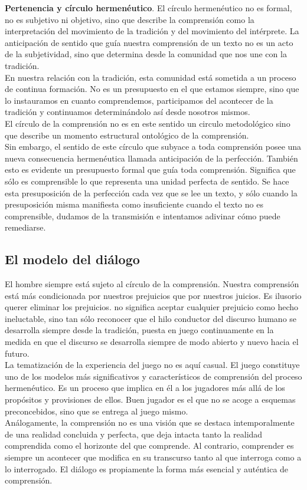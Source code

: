 \documentclass[a4paper, 11pt, twocolumn, spanish]{article}
\begin{document}
\textbf{Pertenencia y círculo hermenéutico}. El círculo hermenéutico no es
 formal, no es subjetivo ni objetivo, sino que describe la comprensión
 como la interpretación del movimiento de la tradición y del
 movimiento del intérprete. La anticipación de sentido que guía
 nuestra comprensión de un texto no es un acto de la subjetividad,
 sino que determina desde la comunidad que nos une con la
 tradición.\\[0pt]
 En nuestra relación con la tradición, esta comunidad está sometida a
 un proceso de continua formación. No es un presupuesto en el que
 estamos siempre, sino que lo instauramos en cuanto comprendemos,
 participamos del acontecer de la tradición y continuamos
 determinándolo así desde nosotros mismos.\\[0pt]
 El círculo de la comprensión no es en este sentido un circulo
 metodológico sino que describe un momento estructural ontológico de
 la comprensión.\\[0pt]
 Sin embargo, el sentido de este círculo que subyace a toda
 comprensión posee una nueva consecuencia hermenéutica llamada
 anticipación de la perfección. También esto es evidente un
 presupuesto formal que guía toda comprensión. Significa que sólo es
 comprensible lo que representa una unidad perfecta de sentido. Se
 hace esta presuposición de la perfección cada vez que se lee un
 texto, y sólo cuando la presuposición misma manifiesta como
 insuficiente cuando el texto no es comprensible, dudamos de la
 transmisión e intentamos adivinar cómo puede remediarse.


\subsection{El modelo del diálogo}
\label{sec:org752a4e3}
El hombre siempre está sujeto al círculo de la comprensión. Nuestra
comprensión está más condicionada por nuestros prejuicios que por
nuestros juicios. Es ilusorio querer eliminar los prejuicios. no
significa aceptar cualquier prejuicio como hecho ineluctable, sino tan
sólo reconocer que el hilo conductor del discurso humano se desarrolla
siempre desde la tradición, puesta en juego continuamente en la medida
en que el discurso se desarrolla siempre de modo abierto y nuevo hacia
el futuro.\\[0pt]

La tematización de la experiencia del juego no es aquí casual. El
juego constituye uno de los modelos más significativos y
característicos de comprensión del proceso hermenéutico. Es un proceso
que implica en él a los jugadores más allá de los propósitos y
provisiones de ellos. Buen jugador es el que no se acoge a esquemas
preconcebidos, sino que se entrega al juego mismo.\\[0pt]
Análogamente, la comprensión no es una visión que se destaca
intemporalmente de una realidad concluida y perfecta, que deja intacta
tanto la realidad comprendida como el horizonte del que comprende. Al
contrario, comprender es siempre un acontecer que modifica en su
transcurso tanto al que interroga como a lo interrogado. El diálogo es
propiamente la forma más esencial y auténtica de comprensión.\\[0pt]
\end{document}
